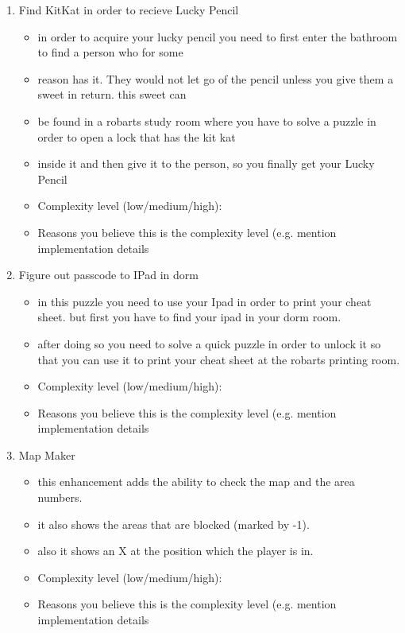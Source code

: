 \documentclass[11pt]{article}
\begin{document}
\begin{enumerate}
\item Find KitKat in order to recieve Lucky Pencil
	\begin{itemize}
	\item in order to acquire your lucky pencil you need to first enter the bathroom to find a person who for some
	\item reason has it. They would not let go of the pencil unless you give them a sweet in return. this sweet can
	\item be found in a robarts study room where you have to solve a puzzle in order to open a lock that has the kit kat
	\item inside it and then give it to the person, so you finally get your Lucky Pencil
	\item Complexity level (low/medium/high):
	\item Reasons you believe this is the complexity level (e.g. mention implementation details
	\end{itemize}

\item Figure out passcode to IPad in dorm
	\begin{itemize}
	\item in this puzzle you need to use your Ipad in order to print your cheat sheet. but first you have to find your ipad in your dorm room.
	\item after doing so you need to solve a quick puzzle in order to unlock it so that you can use it to print your cheat sheet at the robarts printing room.
	\item Complexity level (low/medium/high):
	\item Reasons you believe this is the complexity level (e.g. mention implementation details
	\end{itemize}


\item Map Maker
	\begin{itemize}
	\item this enhancement adds the ability to check the map and the area numbers.
	\item it also shows the areas that are blocked (marked by -1).
	\item also it shows an X at the position which the player is in.
	\item Complexity level (low/medium/high):
	\item Reasons you believe this is the complexity level (e.g. mention implementation details
	\end{itemize}


\end{enumerate}
\end{document}
